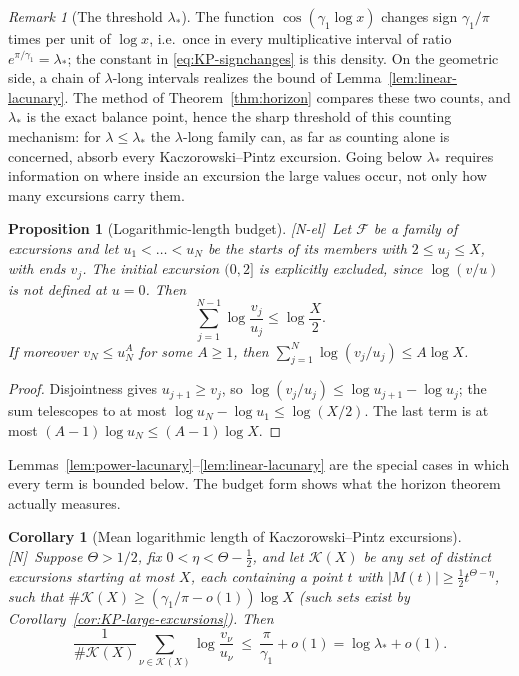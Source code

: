 \documentclass[11pt,reqno]{amsart}
\numberwithin{equation}{section}
\theoremstyle{plain}
\newtheorem{proposition}[theorem]{Proposition}
\newtheorem{corollary}[theorem]{Corollary}
\theoremstyle{definition}
\theoremstyle{remark}
\newtheorem{remark}[theorem]{Remark}
\newcommand{\F}{\mathcal{F}}
\newcommand{\tagN}{\textup{[N]}}
\newcommand{\tagNE}{\textup{[N-el]}}
\begin{document}
\begin{remark}[The threshold $\lambda_*$]
\label{rem:lambda-star}
The function $\cos(\gamma_1\log x)$ changes sign $\gamma_1/\pi$ times per
unit of $\log x$, i.e.\ once in every multiplicative interval of ratio
$e^{\pi/\gamma_1}=\lambda_*$; the constant in \eqref{eq:KP-signchanges} is
this density. On the geometric side, a chain of $\lambda$-long intervals
realizes the bound of Lemma~\ref{lem:linear-lacunary}. The method of
Theorem~\ref{thm:horizon} compares these two counts, and $\lambda_*$ is the
exact balance point, hence the sharp threshold of this counting mechanism:
for $\lambda\le\lambda_*$ the $\lambda$-long
family can, as far as counting alone is concerned, absorb every
Kaczorowski--Pintz excursion. Going below $\lambda_*$ requires information
on where inside an excursion the large values occur, not only how many
excursions carry them.
\end{remark}

\begin{proposition}[Logarithmic-length budget]
\label{prop:log-budget}
\tagNE\ Let $\F$ be a family of excursions and let $u_1<\dots<u_N$ be the starts of
its members with $2\le u_j\le X$, with ends $v_j$.  The initial excursion
$(0,2]$ is explicitly excluded, since $\log(v/u)$ is not defined at
$u=0$.  Then
\begin{equation}
\sum_{j=1}^{N-1}\log\frac{v_j}{u_j}\le\log\frac X2 .
\end{equation}
If moreover $v_N\le u_N^A$ for some $A\ge1$, then
$\sum_{j=1}^{N}\log(v_j/u_j)\le A\log X$.
\end{proposition}

\begin{proof}
Disjointness gives $u_{j+1}\ge v_j$, so
$\log(v_j/u_j)\le\log u_{j+1}-\log u_j$; the sum telescopes to at most
$\log u_N-\log u_1\le\log(X/2)$. The last term is at most
$(A-1)\log u_N\le(A-1)\log X$.
\end{proof}

Lemmas~\ref{lem:power-lacunary}--\ref{lem:linear-lacunary} are the special
cases in which every term is bounded below. The budget form shows what the
horizon theorem actually measures.

\begin{corollary}[Mean logarithmic length of Kaczorowski--Pintz excursions]
\label{cor:KP-mean-log-length}
\tagN\ Suppose $\Theta>1/2$, fix $0<\eta<\Theta-\frac12$, and let $\mathcal K(X)$
be any set of distinct excursions starting at most $X$, each containing a
point $t$ with $|M(t)|\ge\frac12t^{\Theta-\eta}$, such that
$\#\mathcal K(X)\ge(\gamma_1/\pi-o(1))\log X$ (such sets exist by
Corollary~\ref{cor:KP-large-excursions}). Then
\begin{equation}
\frac1{\#\mathcal K(X)}\sum_{\nu\in\mathcal K(X)}\log\frac{v_\nu}{u_\nu}
\ \le\ \frac{\pi}{\gamma_1}+o(1)=\log\lambda_*+o(1).
\end{equation}
\end{corollary}
\end{document}
